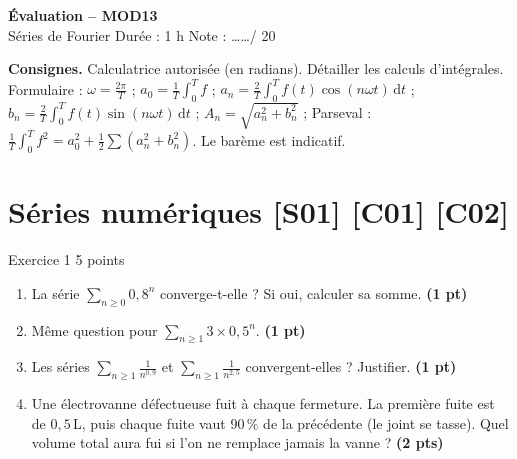 \documentclass[a4paper,11pt]{article}
\newcommand{\pts}[1]{\hfill{\color{uimmred}\small\textbf{(#1)}}}
\begin{document}
\begin{tcolorbox}[colback=uimmred, colframe=uimmred, sharp corners, boxrule=0pt,
  left=14pt, right=14pt, top=10pt, bottom=10pt]
{\color{white}\LARGE\bfseries Évaluation -- MOD13}\\[4pt]
{\color{white}\large Séries de Fourier \hfill Durée : 1 h \quad Note : \dots\dots / 20}
\end{tcolorbox}

\vspace{2pt}

\begin{consigne}
\textbf{Consignes.} Calculatrice autorisée (en radians). Détailler les calculs d'intégrales. Formulaire : $\omega = \frac{2\pi}{T}$ ; $a_0 = \frac1T\int_0^T f$ ; $a_n = \frac2T\int_0^T f(t)\cos(n\omega t)\,\mathrm dt$ ; $b_n = \frac2T\int_0^T f(t)\sin(n\omega t)\,\mathrm dt$ ; $A_n = \sqrt{a_n^2+b_n^2}$ ; Parseval : $\frac1T\int_0^T f^2 = a_0^2 + \frac12\sum(a_n^2+b_n^2)$. Le barème est indicatif.
\end{consigne}

\needspace{8cm}
\section{Séries numériques \hfill {\normalsize\color{uimmred}[S01] [C01] [C02]}}
\begin{exo}{Exercice 1 \hfill 5 points}
\label{ev:1}
\begin{enumerate}
  \item La série $\sum_{n\geq 0} 0{,}8^n$ converge-t-elle ? Si oui, calculer sa somme. \pts{1 pt}
  \item Même question pour $\sum_{n\geq 1} 3\times 0{,}5^n$. \pts{1 pt}
  \item Les séries $\sum_{n\geq1}\frac{1}{n^{0{,}9}}$ et $\sum_{n\geq1}\frac{1}{n^{2{,}5}}$ convergent-elles ? Justifier. \pts{1 pt}
  \item Une électrovanne défectueuse fuit à chaque fermeture. La première fuite est de $0{,}5$\,L, puis chaque fuite vaut $90\,\%$ de la précédente (le joint se tasse). Quel volume total aura fui si l'on ne remplace jamais la vanne ? \pts{2 pts}
\end{enumerate}
\end{exo}
\end{document}
